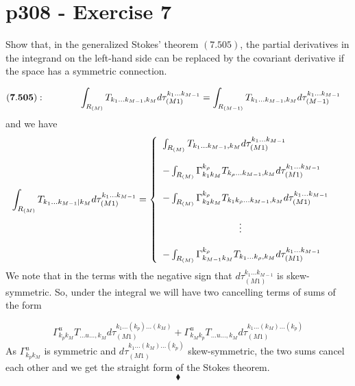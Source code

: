 \section{p308 - Exercise 7}
\begin{tcolorbox}
Show that, in the generalized Stokes' theorem $\mathbf{(7.505)}$, the partial derivatives in the integrand on the left-hand side can be replaced by the covariant derivative if the space has a symmetric connection.
\end{tcolorbox}
\begin{align}
\mathbf{(7.505):}\quad\quad\quad\quad \int_{R_{(M)}} T_{k_1\dots k_{M-1},k_M}d\tau_{(M1)}^{k_1\dots k_{M-1}}&= \int_{R_{(M-1)}} T_{k_1\dots k_{M-1},k_M}d\tau_{(M-1)}^{k_1\dots k_{M-1}}
\end{align}
and we have 
\begin{align}
\int_{R_{(M)}} T_{k_1\dots k_{M-1}|k_M}d\tau_{(M1)}^{k_1\dots k_{M-1}}&= \left\{\begin{array}{l}
\int_{R_{(M)}} T_{k_1\dots k_{M-1},k_M}d\tau_{(M1)}^{k_1\dots k_{M-1}}\\\\
-\int_{R_{(M)}} \Gamma^{k_{\rho}}_{k_1 k_M}T_{k_{\rho}\dots k_{M-1},k_M}d\tau_{(M1)}^{k_1\dots k_{M-1}}\\\\
-\int_{R_{(M)}} \Gamma^{k_{\rho}}_{k_2 k_M}T_{k_1 k_{\rho}\dots k_{M-1},k_M}d\tau_{(M1)}^{k_1\dots k_{M-1}}\\\\
\quad\quad\quad\quad \quad\quad\quad\quad \vdots\\\\
-\int_{R_{(M)}} \Gamma^{k_{\rho}}_{k_{M-1} k_M}T_{k_1\dots k_{\rho},k_M}d\tau_{(M1)}^{k_1\dots k_{M-1}}
\end{array}\right.
\end{align}
We note that in the terms with the negative sign that $d\tau_{(M1)}^{k_1\dots k_{M-1}}$ is skew-symmetric. So, under the integral we will have two cancelling terms of sums of the form 

$$ \Gamma^{u}_{k_p k_M}T_{\dots u \dots ,k_M}d\tau_{(M1)}^{k_1\dots (k_p)\dots (k_{M})}+\Gamma^{u}_{k_M k_p }T_{\dots u \dots ,k_M}d\tau_{(M1)}^{k_1\dots (k_{M})\dots (k_p)}$$
As $\Gamma^{u}_{k_p k_M}$ is symmetric and  $d\tau_{(M1)}^{k_1\dots (k_{M})\dots (k_p)}$ skew-symmetric, the two sums cancel each other and we get the straight form of the Stokes theorem.
$$\blacklozenge$$\\
\newpage


